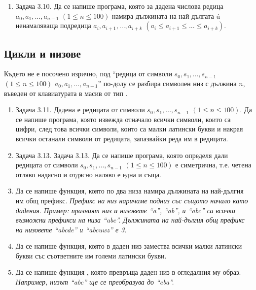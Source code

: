 {\begin{enumerate}[]
		\item Задача 3.10. \cite{sbornik} Да се напише програма, която за дадена числова редица $a_0, a_1, ..., a_{n-1}$ $(1 \leq n \leq 100)$ намира дължината на най-дългата ú ненамаляваща подредица $a_i, a_{i+1}, ..., a_{i+k}$ $(a_i \leq a_{i+1} \leq ... \leq a_{i+k})$.


\end{enumerate}

\subsection {Цикли и низове}
Където не е посочено изрично, под ``редица от символи $s_0, s_1, ..., s_{n-1}$ $(1 \leq n \leq 100)$ $a_0, a_1, ..., a_{n-1}$'' по-долу се разбира символен низ с дължина $n$, въведен от клавиатурата в масив от тип .

\begin{enumerate}[resume]


  \item Задача 3.11. \cite{sbornik}	Дадена е редицата от символи $s_0, s_1, ..., s_{n-1}$ $(1 \leq n \leq 100)$. Да се напише програма, която извежда отначало всички символи, които са цифри, след това всички символи, които са малки латински букви и накрая всички останали символи от редицата, запазвайки реда им в редицата.

	\item Задача 3.13. \cite{sbornik} Задача 3.13. Да се напише програма, която определя дали редицата от символи $s_0, s_1, ..., s_{n-1}$ $(1 \leq n \leq 100)$ е симетрична, т.е. четена отляво надясно и отдясно наляво е една и съща.

  \item Да се напише функция, която по два низа намира дължината на най-дългия им общ префикс. \textit{Префикс на низ наричаме подниз със същото начало като дадения. Пример: празният низ и низовете ``a'', ``ab'', и ``abc'' са всички възможни префикси на низа ``abc''. Дължината на най-дългия общ префикс на низовете ``abcde'' и ``abcuwz'' е 3.}

  \item Да се напише функция, която в даден низ замества всички малки латински букви със съответните им големи латински букви.

  \item Да се напише функция , която превръща даден низ в огледалния му образ. \textit{Например, низът ``abc'' ще се преобразува до ``cba''.}


\end{enumerate}}
